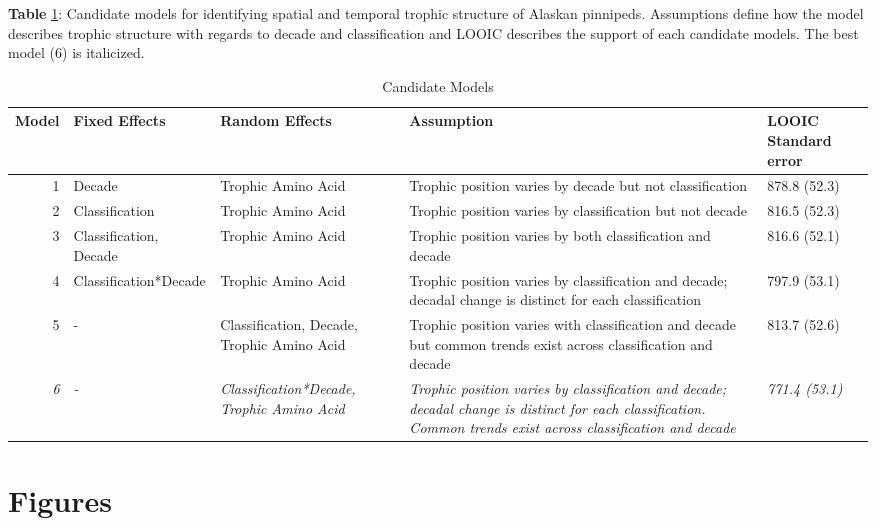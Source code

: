 \documentclass [11pt, proquest] {uwthesis}[2015/03/03]
\begin{document}
\clearpage

\textbf{Table} \ref{tab:candmodels}: Candidate models for identifying
spatial and temporal trophic structure of Alaskan pinnipeds. Assumptions
define how the model describes trophic structure with regards to decade
and classification and LOOIC describes the support of each candidate
models. The best model (6) is italicized.

\begingroup\fontsize{8}{10}\selectfont
\begin{longtable}[t]{r>{\raggedright\arraybackslash}p{13em}>{\raggedright\arraybackslash}p{13em}>{\raggedright\arraybackslash}p{13em}l}
\caption{\label{tab:candmodels}Candidate Models}\\
\toprule
Model & Fixed Effects & Random Effects & Assumption & LOOIC  Standard error \\
\midrule
1 & Decade & Trophic Amino Acid & Trophic position varies by decade but not classification & 878.8 (52.3)\\
2 & Classification & Trophic Amino Acid & Trophic position varies by classification but not decade & 816.5 (52.3)\\
3 & Classification, Decade & Trophic Amino Acid & Trophic position varies by both classification and decade & 816.6 (52.1)\\
4 & Classification*Decade & Trophic Amino Acid & Trophic position varies by classification and decade; decadal change is distinct for each classification & 797.9 (53.1)\\
5 & - & Classification, Decade, Trophic Amino Acid & Trophic position varies with classification and decade but common trends exist across classification and decade & 813.7 (52.6)\\
\addlinespace
\em{6} & \em{-} & \em{Classification*Decade, Trophic Amino Acid} & \em{Trophic position varies by classification and decade; decadal change is distinct for each classification. Common trends exist across classification and decade} & \em{771.4 (53.1)}\\
\bottomrule
\end{longtable}
\endgroup{}

\clearpage

\section{Figures}\label{figures-3}
\end{document}
